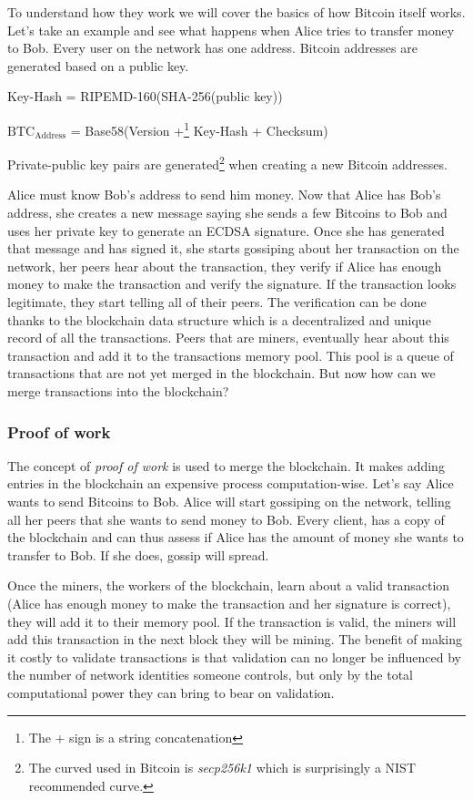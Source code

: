 \documentclass{vldb}
\begin{document}
To understand how they work we will cover the basics of how Bitcoin itself works. Let's take an example and see what happens when Alice tries to transfer money to Bob. Every user on the network has one address. Bitcoin addresses\cite{bitcoinSpec} are generated based on a public key. 
\begin{center}

Key-Hash = RIPEMD-160(SHA-256(public key))

$\text{BTC}_{\text{Address}}$ = Base58(Version +\footnote{The + sign is a string concatenation} Key-Hash + Checksum)
\end{center}

Private-public key pairs are generated\footnote{The curved used in Bitcoin is \emph{secp256k1} which is surprisingly a NIST recommended curve.} when creating a new Bitcoin addresses.

Alice must know Bob's address to send him money. Now that Alice has Bob's address, she creates a new message saying she sends a few Bitcoins to Bob and uses her private key to generate an ECDSA signature. Once she has generated that message and has signed it, she starts gossiping about her transaction on the network, her peers hear about the transaction, they verify if Alice has enough money to make the transaction and verify the signature. If the transaction looks legitimate, they start telling all of their peers. The verification can be done thanks to the blockchain data structure which is a decentralized and unique record of all the transactions. Peers that are miners, eventually hear about this transaction and add it to the transactions memory pool. This pool is a queue of transactions that are not yet merged in the blockchain. But now how can we merge transactions into the blockchain? 

\subsubsection{Proof of work}

The concept of \emph{proof of work} is used to merge the blockchain. It makes adding entries in the blockchain an expensive process computation-wise. Let's say Alice wants to send Bitcoins to Bob. Alice will start gossiping on the network, telling all her peers that she wants to send money to Bob. Every client, has a copy of the blockchain and can thus assess if Alice has the amount of money she wants to transfer to Bob. If she does, gossip will spread.

Once the miners, the workers of the blockchain, learn about a valid transaction (Alice has enough money to make the transaction and her signature is correct), they will add it to their memory pool. If the transaction is valid, the miners will add this transaction in the next block they will be mining. The benefit of making it costly to validate transactions is that validation can no longer be influenced by the number of network identities someone controls, but only by the total computational power they can bring to bear on validation.
\end{document}
